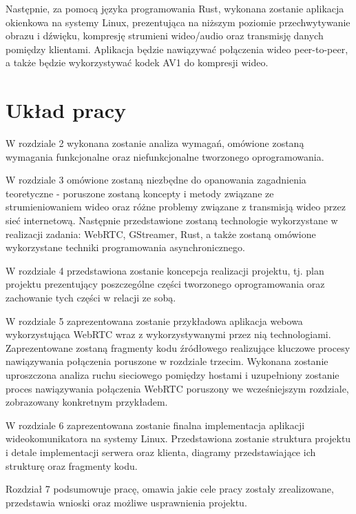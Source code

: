 Następnie, za pomocą języka programowania Rust, wykonana zostanie aplikacja okienkowa na systemy
Linux, prezentująca na niższym poziomie przechwytywanie obrazu i dźwięku, kompresję strumieni
wideo/audio oraz transmisję danych pomiędzy klientami. Aplikacja będzie nawiązywać połączenia wideo
peer-to-peer, a także będzie wykorzystywać kodek AV1 do kompresji wideo.

\section{Układ pracy}

W rozdziale 2 wykonana zostanie analiza wymagań, omówione zostaną wymagania funkcjonalne oraz
niefunkcjonalne tworzonego oprogramowania.

W rozdziale 3 omówione zostaną niezbędne do opanowania zagadnienia teoretyczne - poruszone zostaną
koncepty i metody związane ze strumieniowaniem wideo oraz różne problemy związane z transmisją wideo
przez sieć internetową.
Następnie przedstawione zostaną technologie wykorzystane w realizacji
zadania: WebRTC, GStreamer, Rust, a także zostaną omówione wykorzystane techniki programowania
asynchronicznego.

W rozdziale 4 przedstawiona zostanie koncepcja realizacji projektu, tj. plan projektu prezentujący
poszczególne części tworzonego oprogramowania oraz zachowanie tych części w relacji ze sobą.

W rozdziale 5 zaprezentowana zostanie przykładowa aplikacja webowa wykorzystująca WebRTC wraz z
wykorzystywanymi przez nią technologiami. Zaprezentowane zostaną fragmenty kodu źródłowego
realizujące kluczowe procesy nawiązywania połączenia poruszone w rozdziale trzecim. Wykonana
zostanie uproszczona analiza ruchu sieciowego pomiędzy hostami i uzupełniony zostanie proces
nawiązywania połączenia WebRTC poruszony we wcześniejszym rozdziale, zobrazowany konkretnym
przykładem.

W rozdziale 6 zaprezentowana zostanie finalna implementacja aplikacji wideokomunikatora na systemy
Linux. Przedstawiona zostanie struktura projektu i detale implementacji serwera oraz klienta,
diagramy przedstawiające ich strukturę oraz fragmenty kodu.

Rozdział 7 podsumowuje pracę, omawia jakie cele pracy zostały zrealizowane, przedstawia wnioski oraz
możliwe usprawnienia projektu.

